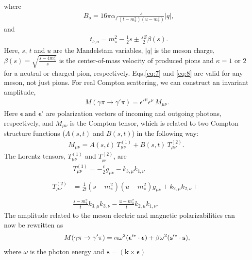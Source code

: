 \documentclass[3p,times,twocolumn]{revtex4}
\begin{document}
where 
\begin{eqnarray*}
  &\displaystyle{B_{o}=16\pi\alpha_{f}{\displaystyle \frac{s}{(t-m_{\pi}^{2})(u-m_{\pi}^{2})}}|q|}, 
\end{eqnarray*}
and
\begin{eqnarray*}
  &\displaystyle t_{b,a}=m_{\pi}^{2}-\frac{1}{2}s\pm\frac{sZ}{2}\beta(s).
\end{eqnarray*}
Here, $s,\, t$ and $u$ are the Mandelstam variables, $|q|$ is
the meson charge, $\beta(s)=\sqrt{\frac{s-4m_{\pi}^{2}}{s}}$ is
the center-of-mass velocity of produced pions and $\kappa=1$ or $2$  for a
neutral or charged pion, respectively.
Eqs.\ref{eq:7} and \ref{eq:8} are valid for any meson, not just pions. For real Compton scattering, we can construct an
invariant amplitude,
\begin{eqnarray}
\ M(\gamma\pi\rightarrow\gamma'\pi)=\epsilon'^{\mu}\epsilon^{\nu}\ M_{\mu\nu}.\label{eq:9}
\end{eqnarray}
Here $\boldsymbol{\epsilon}\:\mbox{and }\boldsymbol{\epsilon'}$ are
polarization vectors of incoming and outgoing photons, respectively,
and $M_{\mu\nu}$ is the Compton tensor, which is related to two Compton
structure functions ($A(s,t)$ and $B(s,t)$) in the following way:
\begin{eqnarray}
M_{\mu\nu}=A(s,t)\ T_{\mu\nu}^{(1)}+B(s,t)\ T_{\mu\nu}^{(2)}.\label{eq:10}
\end{eqnarray}
The Lorentz tensors, $T_{\mu\nu}^{(1)}$ and $T_{_{\mu\nu}}^{(2)}$, are
\begin{eqnarray}
&T_{\mu\nu}^{(1)}  =-\displaystyle{\frac{t}{2}g_{\mu\nu}-k_{3,\mu}k_{1,\nu}}\nonumber \\
\nonumber \\
T_{\mu\nu}^{(2)}& =\displaystyle{\frac{1}{2t}(s-m_{\pi}^{2})(u-m_{\pi}^{2})g_{\mu\nu}+k_{2,\mu}k_{2,\nu}+}\nonumber \\ 
\nonumber \\
&\displaystyle{\frac{s-m_{\pi}^{2}}{t}k_{3,\mu}k_{3,\nu}-\frac{u-m_{\pi}^{2}}{t}k_{2,\mu}k_{1,\nu}}.\label{eq:11} 
\end{eqnarray}
The amplitude related
to the meson electric and magnetic polarizabilities can now be rewritten as
\begin{eqnarray}
\ M(\gamma\pi\rightarrow\gamma'\pi)=\alpha\omega^{2}(\boldsymbol{\epsilon}{}^{\prime*}\cdot\boldsymbol{\epsilon})+\beta\omega^{2}({\bf s}{}^{\prime*}\cdot{\bf s}),\label{eq:12}
\end{eqnarray}
where $\omega$ is the photon energy and $\boldsymbol{s}=(\boldsymbol{k}\times\boldsymbol{\epsilon})$
\end{document}
